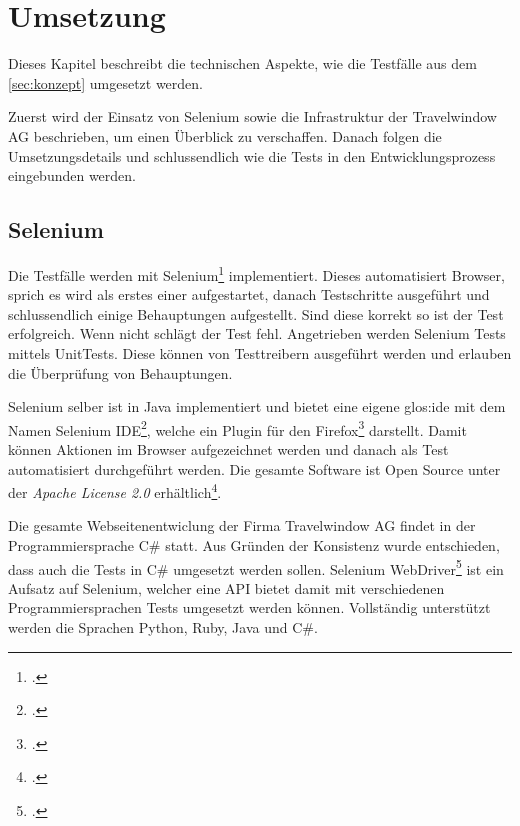 

\chapter{Umsetzung}
\label{sec:umsetzung}

Dieses Kapitel beschreibt die technischen Aspekte, wie die Testfälle aus dem \cref{sec:konzept}  umgesetzt werden.

Zuerst wird der Einsatz von Selenium sowie die Infrastruktur der Travelwindow AG beschrieben, um einen Überblick zu verschaffen. Danach folgen die Umsetzungsdetails und schlussendlich wie die Tests in den Entwicklungsprozess eingebunden werden.

\section{Selenium}
\label{sec:umsetzung:selenium}
Die Testfälle werden mit Selenium\footcite{Selenium_-_Web_Browser_Automation_2015-09-26} implementiert. Dieses automatisiert Browser, sprich es wird als erstes einer aufgestartet, danach Testschritte ausgeführt und schlussendlich einige Behauptungen aufgestellt. Sind diese korrekt so ist der Test erfolgreich. Wenn nicht schlägt der Test fehl. 
Angetrieben werden Selenium Tests mittels UnitTests. Diese können von Testtreibern ausgeführt werden und erlauben die Überprüfung von Behauptungen.

Selenium selber ist in Java implementiert und bietet eine eigene \Gls{glos:ide} mit dem Namen Selenium IDE\footcite{Selenium_IDE_Plugins_2015-09-26}, welche ein Plugin für den Firefox\footcite{Download_Firefox__Free_Web_Browser__Mozilla_2015-09-26} darstellt. Damit können Aktionen im Browser aufgezeichnet werden und danach als Test automatisiert durchgeführt werden. Die gesamte Software ist Open Source unter der \textit{Apache License 2.0} erhältlich\footcite{Selenium_software_-_Wikipedia,_the_free_encyclopedia_2015-09-26}.

Die gesamte Webseitenentwiclung der Firma Travelwindow AG findet in der Programmiersprache C\# statt. Aus Gründen der Konsistenz wurde entschieden, dass auch die Tests in C\# umgesetzt werden sollen. 
Selenium WebDriver\footcite{Selenium_WebDriver_2015-09-26} ist ein Aufsatz auf Selenium, welcher eine API bietet damit mit verschiedenen Programmiersprachen Tests umgesetzt werden können. Vollständig unterstützt werden die Sprachen Python, Ruby, Java und C\#. 

